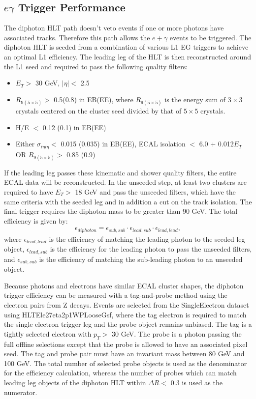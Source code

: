 \documentclass[thesis.tex]{subfiles}
\renewcommand\_{\textunderscore\allowbreak}
\begin{document}
\subsection{$e\gamma$ Trigger Performance}
The diphoton HLT path doesn't veto events if one or more photons have associated tracks. 
Therefore this path allows the $e+\gamma$ events to be triggered.
The diphoton HLT is seeded from a combination of various L1 EG triggers to achieve an optimal L1 efficiency. 
The leading leg of the HLT is then reconstructed around the L1 seed and required to pass the following quality filters: 
\begin{itemize}
	\item $E_T > $ 30 GeV, $|\eta| < $ 2.5
	\item $R_{9 (5\times5)} >$ 0.5(0.8) in EB(EE), where $R_{9(5\times5)}$ is the energy sum of $3\times3$ crystals centered on the cluster seed divided by that of $5\times5$ crystals.
	\item H/E $<$ 0.12 (0.1) in EB(EE)
	\item Either $\sigma_{i\eta i\eta} <$ 0.015 (0.035) in EB(EE), ECAL isolation $<$ 6.0 + 0.012$E_T$ \\
		OR $R_{9 (5\times5)} >$ 0.85 (0.9)
\end{itemize}

If the leading leg passes these kinematic and shower quality filters, the entire ECAL data will be reconstructed. 
In the unseeded step, at least two clusters are required to have $E_T > $ 18 GeV and pass the unseeded filters, which have the same criteria with the seeded leg and in addition a cut on the track isolation. 
The final trigger requires the diphoton mass to be greater than 90 GeV. The total efficiency is given by:
\begin{eqnarray*}
	\epsilon_{diphoton} = \epsilon_{sub, sub} \cdot \epsilon_{lead, sub} \cdot \epsilon_{lead, lead},
\end{eqnarray*}
where $\epsilon_{lead, lead}$ is the efficiency of matching the leading photon to the seeded leg object, $\epsilon_{lead, sub}$ is the efficiency for the leading photon to pass the unseeded filters, and $ \epsilon_{sub, sub}$ is the efficiency of matching the sub-leading photon to an unseeded object. 

Because photons and electrons have similar ECAL cluster shapes, the diphoton trigger efficiency can be measured with a tag-and-probe method using the electron pairs from Z decays. 
Events are selected from the SingleElectron dataset using HLT\_Ele27\_eta2p1\_WPLoose\_Gsf, where the tag electron is required to match the single electron trigger leg and the probe object remains unbiased. 
The tag is a tightly selected electron with $p_T >$ 30 GeV.  
The probe is a photon passing the full offline selections except that the probe is allowed to have an associated pixel seed.
The tag and probe pair must have an invariant mass between 80 GeV and 100 GeV. 
The total number of selected probe objects is used as the denominator for the efficiency calculation, whereas the number of probes which can match leading leg objects of the diphoton HLT within $\Delta R <$ 0.3 is used as the numerator. 
\end{document}
